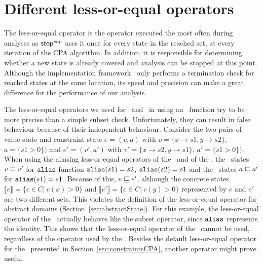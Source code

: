 \section{Different less-or-equal operators}
\label{sec:leqOperators}
The less-or-equal operator is the operator executed the most often during analyses as $\operatorname{\operatorname{\mathsf{stop}}}^{sep}$ uses it once for every state in the reached set, at every iteration of the CPA algorithm.
In addition, it is responsible for determining whether a new state is already covered and analysis can be stopped at this point.
Although the implementation framework \cpaChecker\ only performs a termination check for reached states at the same location, 
its speed and precision can make a great difference for the performance of our analysis.

The  less-or-equal operators we used for \symbolicValueAnalysisCPA\ and \constraintsCPA\ in \cite{Lemberger2015} using an \aliasFunc\ function try to be more precise than a simple subset check.
Unfortunately, they can result in false behaviour because of their independent behaviour.
Consider the two pairs of value state and constraint state
$e = (v, a)$ with $v = \{x \rightarrow s1, y \rightarrow s2\}$, $a = \{s1 > 0\})$ and
$e' = (v', a')$ with $v' = \{x \rightarrow s2, y \rightarrow s1\}$, $a' = \{s1 > 0\})$.
When using the aliasing less-or-equal operators of the \symbolicValueAnalysisCPA\ and of the \constraintsCPA,
the \symbolicValueAnalysisCPA\ states
$v \sqsubseteq v'$ for $\texttt{alias}$ function $\texttt{alias}(s1) = s2$, $\texttt{alias}(s2) = s1$ and
the \constraintsCPA\ states
$a \sqsubseteq a'$ for $\texttt{alias}(s1) = s1$.
Because of this, $e \sqsubseteq e'$, although the concrete states
$\llbracket e \rrbracket = \{ c \in C |\ c(x) > 0 \}$ and
$\llbracket e' \rrbracket = \{ c \in C |\ c(y) > 0 \}$
represented by $e$ and $e'$ are two different sets.
This violates the definition of the less-or-equal operator for abstract domains (Section~\ref{sec:abstractState}).
For this example, the less-or-equal operator of the \constraintsCPA\ actually behaves like the subset operator, since $\texttt{alias}$ represents the identity.
This shows that the less-or-equal operator of the \symbolicValueAnalysisCPA\ cannot be used, regardless of the operator used by the \constraintsCPA.
Besides the default less-or-equal operator for the \constraintsCPA\ 
presented in Section~\ref{sec:constraintsCPA}, another operator might prove useful.

